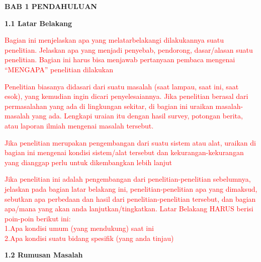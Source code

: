 \begin{spacing}{1.5}
\begin{center}
\textbf{\large BAB 1 PENDAHULUAN}
\end{center}
\textbf{1.1 \indent Latar Belakang}
\bigskip
\begin{justifying}

\textcolor{red}{\indent Bagian ini menjelaskan apa yang melatarbelakangi dilakukannya suatu penelitian. Jelaskan apa yang menjadi penyebab, pendorong, dasar/alasan suatu penelitian. Bagian ini harus bisa menjawab pertanyaan pembaca mengenai “MENGAPA” penelitian dilakukan}

\medskip

\textcolor{red}{\indent Penelitian biasanya didasari dari suatu masalah (saat lampau, saat ini, saat esok), yang kemudian ingin dicari penyelesaiannya. Jika penelitian berasal dari permasalahan yang ada di lingkungan sekitar, di bagian ini uraikan masalah-masalah yang ada. Lengkapi uraian itu dengan hasil survey, potongan berita, atau laporan ilmiah mengenai masalah tersebut.}

\medskip

\textcolor{red}{\indent Jika penelitian merupakan pengembangan dari suatu sistem atau alat, uraikan di bagian ini mengenai kondisi sistem/alat tersebut dan kekurangan-kekurangan yang dianggap perlu untuk dikembangkan lebih lanjut}

\medskip

\textcolor{red}{\indent Jika penelitian ini adalah pengembangan dari penelitian-penelitian sebelumnya, jelaskan pada bagian latar belakang ini, penelitian-penelitian apa yang dimaksud, sebutkan apa perbedaan dan hasil dari penelitian-penelitian tersebut, dan bagian apa/mana yang akan anda lanjutkan/tingkatkan. Latar Belakang HARUS berisi poin-poin berikut ini:} \\
\textcolor{red}{1.\indent Apa kondisi umum (yang mendukung) saat ini}\\
\textcolor{red}{2.\indent Apa kondisi suatu bidang spesifik (yang anda tinjau)}
\bigskip \\
\end{justifying}
\textbf{1.2 Rumusan Masalah}

\end{spacing}